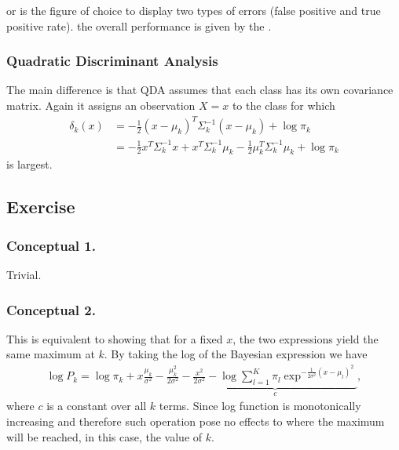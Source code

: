  or  is the figure of choice to display two types of errors (false positive and true positive rate). the overall performance is given by the .
\subsubsection{Quadratic Discriminant Analysis}
The main difference is that QDA assumes that each class has its own covariance matrix. Again it assigns an observation $X = x$ to the class for which 
\begin{align}
\delta_k(x) &= -\frac{1}{2}(x-\mu_k)^T\Sigma_k^{-1}(x-\mu_k) + \log\pi_k \\
& = -\frac{1}{2}x^T\Sigma_k^{-1}x + x^T\Sigma_k^{-1}\mu_k - \frac{1}{2}\mu_k^T\Sigma_k^{-1}\mu_k + \log\pi_k
\end{align}
is largest.
\subsection{Exercise}
\subsubsection{Conceptual 1.}
Trivial.
\subsubsection{Conceptual 2.}
This is equivalent to showing that for a fixed $x$, the two expressions yield the same maximum at $k$. By taking the log of the Bayesian expression we have
\begin{align*}
\log P_k = \log \pi_k + x\frac{\mu_k}{\sigma^2} -\frac{\mu_k^2}{2\sigma^2} - \underbrace{\frac{x^2}{2\sigma^2} - \log\sum_{l=1}^{K}\pi_l\exp^{-\frac{1}{2\sigma^2}(x-\mu_l)^2}}_c,
\end{align*}
where $c$ is a constant over all $k$ terms. Since log function is monotonically increasing and therefore such operation pose no effects to where the maximum will be reached, in this case, the value of $k$.
